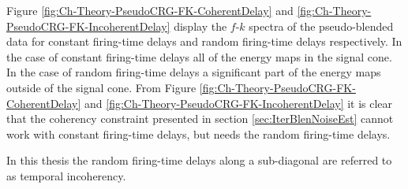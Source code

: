 Figure \ref{fig:Ch-Theory-PseudoCRG-FK-CoherentDelay} and \ref{fig:Ch-Theory-PseudoCRG-FK-IncoherentDelay} display the $f$-$k$ spectra of the pseudo-blended data for constant firing-time delays and random firing-time delays respectively. In the case of constant firing-time delays all of the energy maps in the signal cone. In the case of random firing-time delays a significant part of the energy maps outside of the signal cone. From Figure \ref{fig:Ch-Theory-PseudoCRG-FK-CoherentDelay} and \ref{fig:Ch-Theory-PseudoCRG-FK-IncoherentDelay} it is clear that the coherency constraint presented in section \ref{sec:IterBlenNoiseEst} cannot work with constant firing-time delays, but needs the random firing-time delays. 

In this thesis the random firing-time delays along a sub-diagonal are referred to as temporal incoherency.  


